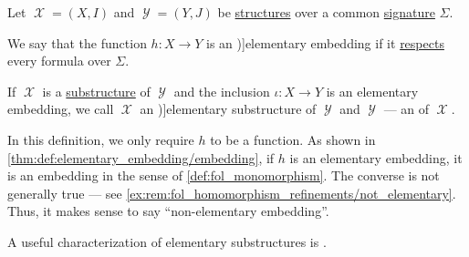 \begin{definition}\label{def:elementary_embedding}
  Let \( \mscrX = (X, I) \) and \( \mscrY = (Y, J) \) be \hyperref[def:fol_structure]{structures} over a common \hyperref[def:fol_signature]{signature} \( \Sigma \).

  We say that the function \( h: X \to Y \) is an \term[ru=элементарное вложение (\cite[237]{Мальцев1970АлгебраическиеСистемы})]{elementary embedding} if it \hyperref[def:fol_function_respect]{respects} every formula over \( \Sigma \).

  If \( \mscrX \) is a \hyperref[def:fol_substructure]{substructure} of \( \mscrY \) and the inclusion \( \iota: X \to Y \) is an elementary embedding, we call \( \mscrX \) an \term[ru=элементарная подмодель (\cite[237]{Мальцев1970АлгебраическиеСистемы})]{elementary substructure} of \( \mscrY \) and \( \mscrY \) --- an  of \( \mscrX \).
\end{definition}
\begin{comments}
  \item In this definition, we only require \( h \) to be a function. As shown in \cref{thm:def:elementary_embedding/embedding}, if \( h \) is an elementary embedding, it is an embedding in the sense of \cref{def:fol_monomorphism}. The converse is not generally true --- see \cref{ex:rem:fol_homomorphism_refinements/not_elementary}. Thus, it makes sense to say \enquote{non-elementary embedding}.

  \item A useful characterization of elementary substructures is .
\end{comments}

